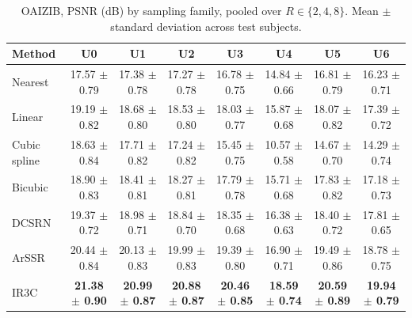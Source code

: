 \begin{table}[pos=!htbp]
\caption{OAIZIB, PSNR (dB) by sampling family, pooled over $R\in\{2,4,8\}$. Mean $\pm$ standard deviation across test subjects.}
\label{tab:detailfam-oaizib}
\footnotesize
\begin{tabular*}{\textwidth}{@{\extracolsep{\fill}}lccccccc@{}}
\toprule
Method & U0 & U1 & U2 & U3 & U4 & U5 & U6 \\
\midrule
Nearest & 17.57 $\pm$ 0.79 & 17.38 $\pm$ 0.78 & 17.27 $\pm$ 0.78 & 16.78 $\pm$ 0.75 & 14.84 $\pm$ 0.66 & 16.81 $\pm$ 0.79 & 16.23 $\pm$ 0.71 \\
Linear & 19.19 $\pm$ 0.82 & 18.68 $\pm$ 0.80 & 18.53 $\pm$ 0.80 & 18.03 $\pm$ 0.77 & 15.87 $\pm$ 0.68 & 18.07 $\pm$ 0.82 & 17.39 $\pm$ 0.72 \\
Cubic spline & 18.63 $\pm$ 0.84 & 17.71 $\pm$ 0.82 & 17.24 $\pm$ 0.82 & 15.45 $\pm$ 0.75 & 10.57 $\pm$ 0.58 & 14.67 $\pm$ 0.70 & 14.29 $\pm$ 0.74 \\
Bicubic & 18.90 $\pm$ 0.83 & 18.41 $\pm$ 0.81 & 18.27 $\pm$ 0.81 & 17.79 $\pm$ 0.78 & 15.71 $\pm$ 0.68 & 17.83 $\pm$ 0.82 & 17.18 $\pm$ 0.73 \\
DCSRN & 19.37 $\pm$ 0.72 & 18.98 $\pm$ 0.71 & 18.84 $\pm$ 0.70 & 18.35 $\pm$ 0.68 & 16.38 $\pm$ 0.63 & 18.40 $\pm$ 0.72 & 17.81 $\pm$ 0.65 \\
ArSSR & 20.44 $\pm$ 0.84 & 20.13 $\pm$ 0.83 & 19.99 $\pm$ 0.83 & 19.39 $\pm$ 0.80 & 16.90 $\pm$ 0.71 & 19.49 $\pm$ 0.86 & 18.78 $\pm$ 0.75 \\
IR3C & \textbf{21.38 $\pm$ 0.90} & \textbf{20.99 $\pm$ 0.87} & \textbf{20.88 $\pm$ 0.87} & \textbf{20.46 $\pm$ 0.85} & \textbf{18.59 $\pm$ 0.74} & \textbf{20.59 $\pm$ 0.89} & \textbf{19.94 $\pm$ 0.79} \\
\bottomrule
\end{tabular*}
\end{table}

